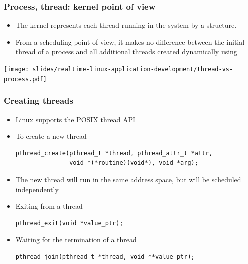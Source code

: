 \begin{frame}
  \frametitle{Process, thread: kernel point of view}
  \begin{itemize}
  \item The kernel represents each thread running in the system by
    a  structure.
  \item From a scheduling point of view, it makes no difference
    between the initial thread of a process and all additional threads
    created dynamically using 
  \end{itemize}
  \begin{center}
    \texttt{[image: slides/realtime-linux-application-development/thread-vs-process.pdf]}
  \end{center}
\end{frame}

\begin{frame}[fragile]
  \frametitle{Creating threads}
  \begin{itemize}
  \item Linux supports the POSIX thread API
  \item To create a new thread
    \begin{block}{}
\small
\begin{verbatim}
pthread_create(pthread_t *thread, pthread_attr_t *attr,
               void *(*routine)(void*), void *arg);
\end{verbatim}
\normalsize
    \end{block}
  \item The new thread will run in the same address space, but will be
    scheduled independently
  \item Exiting from a thread
    \begin{block}{}
\small
\begin{verbatim}
pthread_exit(void *value_ptr);
\end{verbatim}
\normalsize
    \end{block}
  \item Waiting for the termination of a thread
    \begin{block}{}
\small
\begin{verbatim}
pthread_join(pthread_t *thread, void **value_ptr);
\end{verbatim}
\normalsize
    \end{block}
  \end{itemize}
\end{frame}

